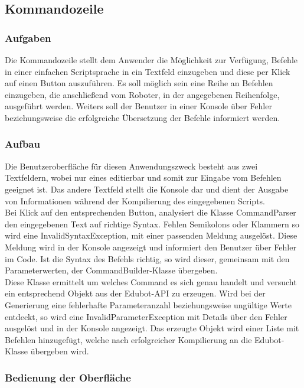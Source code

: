 
\subsection{Kommandozeile}

\subsubsection{Aufgaben}
Die Kommandozeile stellt dem Anwender die Möglichkeit zur Verfügung, Befehle in einer einfachen Scriptsprache in ein Textfeld einzugeben und diese per Klick auf einen Button auszuführen. Es soll möglich sein eine Reihe an Befehlen einzugeben, die anschließend vom Roboter, in der angegebenen Reihenfolge, ausgeführt werden. Weiters soll der Benutzer in einer Konsole über Fehler beziehungsweise die erfolgreiche Übersetzung der Befehle informiert werden.

\subsubsection{Aufbau}
Die Benutzeroberfläche für diesen Anwendungszweck besteht aus zwei Textfeldern, wobei nur eines editierbar und somit zur Eingabe vom Befehlen geeignet ist. Das andere Textfeld stellt die Konsole dar und dient der Ausgabe von Informationen während der Kompilierung des eingegebenen Scripts. \\
Bei Klick auf den entsprechenden Button, analysiert die Klasse CommandParser den eingegebenen Text auf richtige Syntax. Fehlen Semikolons oder Klammern so wird eine InvalidSyntaxException, mit einer passenden Meldung ausgelöst. Diese Meldung wird in der Konsole angezeigt und informiert den Benutzer über Fehler im Code. Ist die Syntax des Befehls richtig, so wird dieser, gemeinsam mit den Parameterwerten, der CommandBuilder-Klasse übergeben.\\
Diese Klasse ermittelt um welches Command es sich genau handelt und versucht ein entsprechend Objekt aus der Edubot-API zu erzeugen. Wird bei der Generierung eine fehlerhafte Parameteranzahl beziehungsweise ungültige Werte entdeckt, so wird eine InvalidParameterException mit Details über den Fehler ausgelöst und in der Konsole angezeigt. Das erzeugte Objekt wird einer Liste mit Befehlen hinzugefügt, welche nach erfolgreicher Kompilierung an die Edubot-Klasse übergeben wird.

\subsubsection{Bedienung der Oberfläche}

